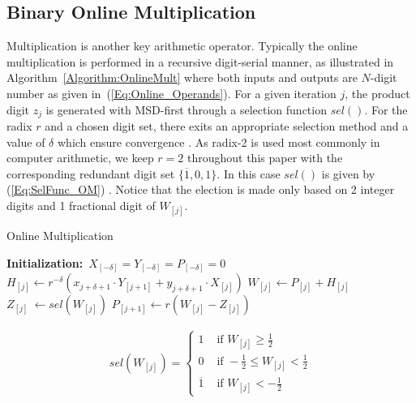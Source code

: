 \documentclass[conference]{IEEEtran}
\begin{document}
\subsection{Binary Online Multiplication}
Multiplication is another key arithmetic operator. Typically the online multiplication is performed in a recursive digit-serial manner, as illustrated in Algorithm~\ref{Algorithm:OnlineMult} \cite{Ercegovac_OnlineMult} where both inputs and outputs are $N$-digit number as given in~(\ref{Eq:Online_Operands}). For a given iteration $j$, the product digit $z_j$ is generated with MSD-first through a selection function $sel()$. For the radix $r$ and a chosen digit set, there exits an appropriate selection method and a value of $\delta$ which ensure convergence \cite{Ercegovac_OnlineMult}. As radix-2 is used most commonly in computer arithmetic, we keep $r=2$ throughout this paper with the corresponding redundant digit set $\{\overline{1},0,1\}$. In this case $sel()$ is given by (\ref{Eq:SelFunc_OM}) \cite{Oregon_OnlineNetwork}. Notice that the election is made only based on 2 integer digits and 1 fractional digit of $W_{[j]}$.

\begin{algorithm}[tbp]
  \caption{Online Multiplication}  \label{Algorithm:OnlineMult}
  \begin{algorithmic}[1]
   \State \textbf{Initialization:}~$X_{[-\delta]}=Y_{[-\delta]}=P_{[-\delta]}=0$\vspace{.5ex}
    \vspace{.5ex}
        \State $H_{[j]} \leftarrow r^{-\delta}\left(x_{j+\delta+1}\cdot Y_{[j+1]}+y_{j+\delta+1}\cdot X_{[j]}\right)$\vspace{.5ex}
        \State $W_{[j]} \leftarrow P_{[j]} + H_{[j]}$\vspace{.5ex}
        \State $Z_{[j]}~ \leftarrow sel(W_{[j]})$\vspace{.5ex}
        \State $P_{[j+1]} \leftarrow r\left(W_{[j]}-Z_{[j]}\right)$\vspace{.5ex}
    \EndFor
  \end{algorithmic}
\end{algorithm}

\begin{eqnarray}\label{Eq:SelFunc_OM}
  sel(W_{[j]})=\begin{cases}
    1 & \text{ if } W_{[j]} \geqslant \frac{1}{2} \\
    0 & \text{ if } -\frac{1}{2}\leqslant W_{[j]}<\frac{1}{2} \\
    \overline{1} & \text{ if } W_{[j]}<-\frac{1}{2}
  \end{cases}
\end{eqnarray}
\end{document}
